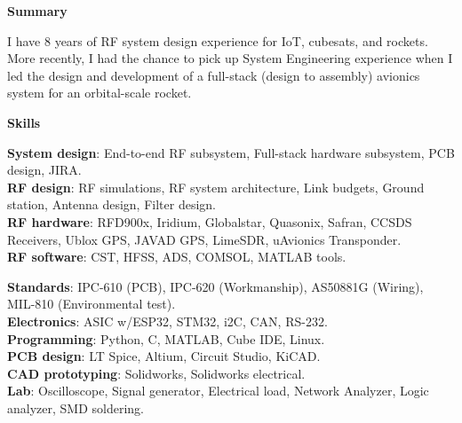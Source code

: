 \documentclass[10pt, Letter]{article}
\newcommand{\cvsection}[1]
{
	\begin{center}
		\large\textcolor{sectcol}{\textbf{#1}}
	\end{center}
}
\begin{document}
\cvsection{Summary}
\vspace{-5pt}
I have 8 years of RF system design experience for IoT, cubesats, and rockets. More recently, I had the chance to pick up System Engineering experience when I led the design and development of a full-stack (design to assembly) avionics system for an orbital-scale rocket. 
\vspace{-2pt}
\cvsection{Skills}
\vspace{-15pt}
\begin{multicols}{2}
\textbf{System design}: End-to-end RF subsystem, Full-stack hardware subsystem, PCB design, JIRA. \\
\textbf{RF design}: RF simulations, RF system architecture, Link budgets, Ground station, Antenna design, Filter design. \\
\textbf{RF hardware}: RFD900x, Iridium, Globalstar, Quasonix, Safran, CCSDS Receivers, Ublox GPS, JAVAD GPS, LimeSDR, uAvionics Transponder. \\
\textbf{RF software}: CST, HFSS, ADS, COMSOL, MATLAB tools.

\columnbreak

\textbf{Standards}: IPC-610 (PCB), IPC-620 (Workmanship), AS50881G (Wiring), MIL-810 (Environmental test). \\
\textbf{Electronics}: ASIC w/ESP32, STM32, i2C, CAN, RS-232. \\
\textbf{Programming}: Python, C, MATLAB, Cube IDE, Linux. \\
\textbf{PCB design}: LT Spice, Altium, Circuit Studio, KiCAD. \\
\textbf{CAD prototyping}: Solidworks, Solidworks electrical. \\
\textbf{Lab}: Oscilloscope, Signal generator, Electrical load, Network Analyzer, Logic analyzer, SMD soldering. 
\end{multicols}

%
%

\end{document}
